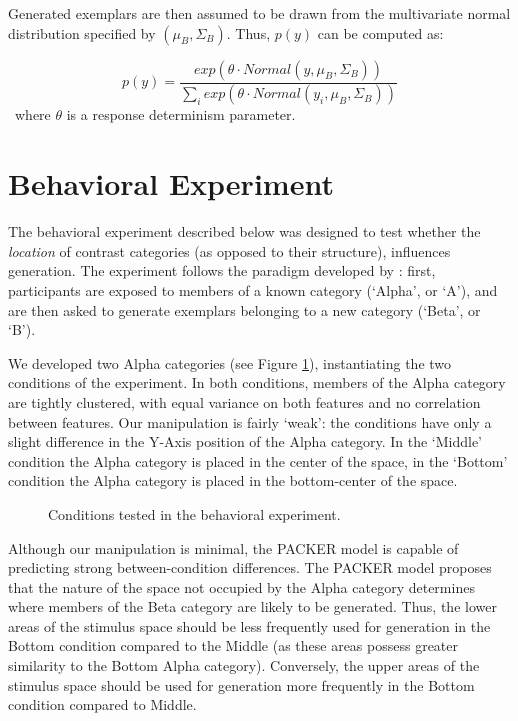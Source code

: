 \documentclass[10pt,letterpaper]{article}
\begin{document}
Generated exemplars are then assumed to be drawn from the multivariate normal distribution specified by $(\mu_{B}, \Sigma_{B})$. Thus, $p(y)$ can be computed as:

\begin{equation}
  p(y) = \dfrac
    {exp( \theta \cdot Normal(y, \mu_{B}, \Sigma_{B}))}
    {\sum_i exp( \theta \cdot Normal(y_i, \mu_{B}, \Sigma_{B}))} 
\end{equation}
\
where $\theta$ is a response determinism parameter.

\section{Behavioral Experiment}

The behavioral experiment described below was designed to test whether the \textit{location} of contrast categories (as opposed to their structure), influences generation. The experiment follows the paradigm developed by \citet{jern2013probabilistic}: first, participants are exposed to members of a known category (`Alpha', or `A'), and are then asked to generate exemplars belonging to a new category (`Beta', or `B'). 

We developed two Alpha categories (see Figure \ref{fig:middle-bottom-conditions}), instantiating the two conditions of the experiment. In both conditions, members of the Alpha category are tightly clustered, with equal variance on both features and no correlation between features. Our manipulation is fairly `weak': the conditions have only a slight difference in the Y-Axis position of the Alpha category. In the `Middle' condition the Alpha category is placed in the center of the space, in the `Bottom' condition the Alpha category is placed in the bottom-center of the space. 

\begin{figure}
    \begin{center}
    
    \caption{Conditions tested in the behavioral experiment.}
    \label{fig:middle-bottom-conditions}
    \end{center}
\end{figure}

Although our manipulation is minimal, the PACKER model is capable of predicting strong between-condition differences. The PACKER model proposes that the nature of the space not occupied by the Alpha category determines where members of the Beta category are likely to be generated. Thus, the lower areas of the stimulus space should be less frequently used for generation in the Bottom condition compared to the Middle (as these areas possess greater similarity to the Bottom Alpha category). Conversely, the upper areas of the stimulus space should be used for generation more frequently in the Bottom condition compared to Middle.
\end{document}
